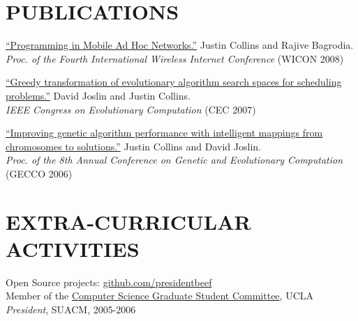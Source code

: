 \documentclass[margin]{res}
\begin{document}
\begin{resume}
\section{PUBLICATIONS}
		\href{http://cs.ucla.edu/~collins/documents/Justin_Collins-WICON08.pdf}{``Programming in Mobile Ad Hoc Networks.''} Justin Collins and Rajive Bagrodia. \\
		{\it Proc. of the Fourth International Wireless Internet Conference} (WICON 2008)

		\href{http://cs.ucla.edu/~collins/documents/Joslin_Collins-Greedy_Transformations_of_Search_Spaces.pdf}{``Greedy transformation of evolutionary algorithm search spaces for scheduling problems.''} David Joslin and Justin Collins.\\
		{\it IEEE Congress on Evolutionary Computation} (CEC 2007)

		\href{http://cs.ucla.edu/~collins/documents/Collins_Joslin-GECCO06-abstract.pdf}{``Improving genetic algorithm performance with intelligent mappings from chromosomes to solutions.''} Justin Collins and David Joslin. \\
		{\it Proc. of the 8th Annual Conference on Genetic and Evolutionary Computation} (GECCO 2006)

\section{EXTRA-CURRICULAR \\ ACTIVITIES}             
            Open Source projects: \href{http://github.com/presidentbeef}{github.com/presidentbeef}\\
	    Member of the \href{http://csgsc.cs.ucla.edu/}{Computer Science Graduate Student Committee}, UCLA \\
            {\it President}, SUACM, 2005-2006

\end{resume}
\end{document}
